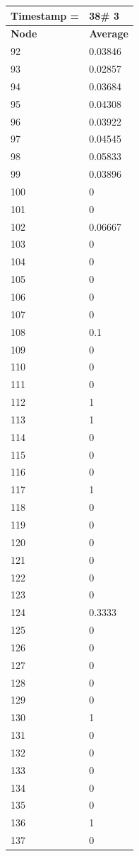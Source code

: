 \begin{tabular}{|l||l|}
\hline
\textbf{Timestamp =} & \textbf{38}\# 3\\\hline
	\textbf{Node} & \textbf{Average} \\ \hline
\hline
	92 & 0.03846 \\ \hline
	93 & 0.02857 \\ \hline
	94 & 0.03684 \\ \hline
	95 & 0.04308 \\ \hline
	96 & 0.03922 \\ \hline
	97 & 0.04545 \\ \hline
	98 & 0.05833 \\ \hline
	99 & 0.03896 \\ \hline
	100 & 0 \\ \hline
	101 & 0 \\ \hline
	102 & 0.06667 \\ \hline
	103 & 0 \\ \hline
	104 & 0 \\ \hline
	105 & 0 \\ \hline
	106 & 0 \\ \hline
	107 & 0 \\ \hline
	108 & 0.1 \\ \hline
	109 & 0 \\ \hline
	110 & 0 \\ \hline
	111 & 0 \\ \hline
	112 & 1 \\ \hline
	113 & 1 \\ \hline
	114 & 0 \\ \hline
	115 & 0 \\ \hline
	116 & 0 \\ \hline
	117 & 1 \\ \hline
	118 & 0 \\ \hline
	119 & 0 \\ \hline
	120 & 0 \\ \hline
	121 & 0 \\ \hline
	122 & 0 \\ \hline
	123 & 0 \\ \hline
	124 & 0.3333 \\ \hline
	125 & 0 \\ \hline
	126 & 0 \\ \hline
	127 & 0 \\ \hline
	128 & 0 \\ \hline
	129 & 0 \\ \hline
	130 & 1 \\ \hline
	131 & 0 \\ \hline
	132 & 0 \\ \hline
	133 & 0 \\ \hline
	134 & 0 \\ \hline
	135 & 0 \\ \hline
	136 & 1 \\ \hline
	137 & 0 \\ \hline
\end{tabular}

